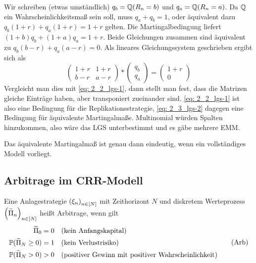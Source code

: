 \begin{*bemerkung}
	Wir schreiben (etwas umständlich) $q_b = \mathbb{Q}(R_n = b)$ und $q_a = \mathbb{Q}(R_n = a)$. Da $\mathbb{Q}$ ein Wahrscheinlichkeitsmaß sein soll, muss $q_a + q_b = 1$, oder äquivalent dazu $q_b (1+r) + q_a (1+r) = 1+r$ gelten. Die Martingalbedingung liefert $(1+b) q_b + (1+a) q_a = 1+r$. Beide Gleichungen zusammen sind äquivalent zu $q_b (b-r) + q_a (a-r) = 0$. Als lineares Gleichungssystem geschrieben ergibt sich als
	\begin{equation*}
		\begin{pmatrix}
			1+r & 1+r \\
			b-r & a-r
		\end{pmatrix}
		* 
		\begin{pmatrix}
			q_b \\ q_a
		\end{pmatrix}
		=
		\begin{pmatrix}
		1+r \\ 0
		\end{pmatrix}
		\tag{LGS-2}
		\label{eq: 2_3_lgs-2}
	\end{equation*}
	Vergleicht man dies mit \eqref{eq: 2_2_lgs-1}, dann stellt man fest, dass die Matrizen gleiche Einträge haben, aber transponiert zueinander sind. 
	\eqref{eq: 2_2_lgs-1} ist also eine Bedingung für die Replikationsstrategie, \eqref{eq: 2_3_lgs-2} dagegen eine Bedingung für äquivalente Martingalmaße.
	Multinomial würden Spalten hinzukommen, also wäre das LGS unterbestimmt und es gäbe mehrere EMM.
\end{*bemerkung}

\begin{*bemerkung}
	Das äquivalente Martingalmaß ist genau dann eindeutig, wenn ein vollständiges Modell vorliegt.
\end{*bemerkung}

\subsection{Arbitrage im CRR-Modell}

\begin{*definition}
	Eine Anlagestrategie $\left( \xi_n \right)_{n \in [N]}$ mit Zeithorizont $N$ und diskretem Werteprozess $\left( \widetilde{\Pi}_n \right)_{n \in [N]}$ heißt Arbitrage, wenn gilt
	\begin{equation*}
		\begin{aligned}
			\widetilde{\Pi}_0 &= 0 	&&\text{(kein Anfangskapital)} \\
			\mathbb{P}(\widetilde{\Pi}_N \ge 0) &= 1 &&\text{(kein Verlustrisiko)} \\
			\mathbb{P}(\widetilde{\Pi}_N > 0) &> 0 &&\text{(positiver Gewinn mit positiver Wahrscheinlichkeit)}
		\end{aligned}
		\tag{Arb} \label{eq: Arb}
	\end{equation*}
\end{*definition}

